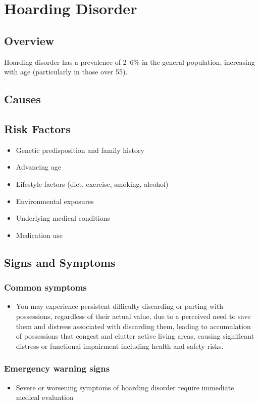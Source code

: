 \chapter{Hoarding Disorder}
\label{sec:Hoarding Disorder}

\section{Overview}
Hoarding disorder has a prevalence of 2--6\% in the general population, increasing with age (particularly in those over 55).
\section{Causes}
\section{Risk Factors}

\begin{itemize}[noitemsep]
  \item Genetic predisposition and family history
  \item Advancing age
  \item Lifestyle factors (diet, exercise, smoking, alcohol)
  \item Environmental exposures
  \item Underlying medical conditions
  \item Medication use
\end{itemize}
\section{Signs and Symptoms}

\subsection{Common symptoms}
\begin{itemize}[noitemsep]
  \item You may experience persistent difficulty discarding or parting with possessions, regardless of their actual value, due to a perceived need to save them and distress associated with discarding them, leading to accumulation of possessions that congest and clutter active living areas, causing significant distress or functional impairment including health and safety risks. 
  \end{itemize}

\subsection{Emergency warning signs}
\begin{itemize}[noitemsep]
  \item Severe or worsening symptoms of hoarding disorder require immediate medical evaluation
\end{itemize}
